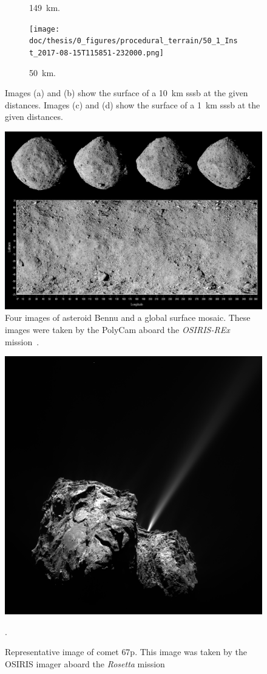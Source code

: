 \begin{figure}[htb]
\begin{subfigure}[b]{0.48\textwidth}
        \caption{\SI{149}{\kilo\meter}.}
        \label{fig:render_quali_comparison_3}
    \end{subfigure}
    \begin{subfigure}[b]{0.48\textwidth}
        \centering
        \texttt{[image: doc/thesis/0\_figures/procedural\_terrain/50\_1\_Inst\_2017-08-15T115851-232000.png]}
        \caption{\SI{50}{\kilo\meter}.}
        \label{fig:render_quali_comparison_4}
    \end{subfigure}
    \caption{Images (a) and (b) show the surface of a \SI{10}{\kilo\meter} \gls{sssb} at the given distances. Images (c) and (d) show the surface of a \SI{1}{\kilo\meter} \gls{sssb} at the given distances.}
    \label{fig:render_quali_comparison}
\end{figure}

\begin{figure}[htb]
    \centering
    \includegraphics[width=.5\textwidth]{doc/thesis/0_figures/procedural_terrain/2963_Bennu.png}
    \caption{Four images of asteroid Bennu and a global surface mosaic. These images were taken by the PolyCam aboard the \textit{OSIRIS-REx} mission~\cite{NASAFourBennu}.}
    \label{fig:render_quali_bennu}
\end{figure}

\begin{figure}[htb]
    \centering
    \includegraphics[width=.5\textwidth]{doc/thesis/0_figures/procedural_terrain/67P_CG.PNG}
    \caption{Representative image of comet \acrlong{67p}. This image was taken by the OSIRIS imager aboard the \textit{Rosetta} mission~\cite{OSIRISArchiveb}}.
    \label{fig:render_quali_67p}
\end{figure}

